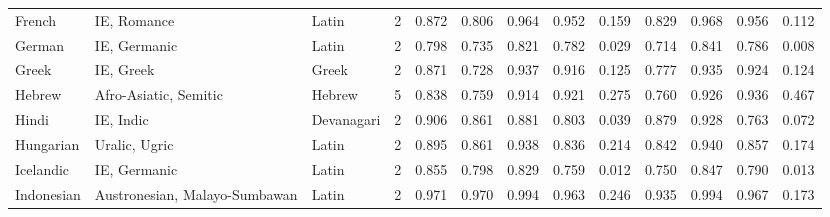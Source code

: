\begin{tabular}{lllrrrrrrrrrr}
                         French &                     IE, Romance &      Latin &         2 &                       0.872 &                         0.806 &         0.964 &                  0.952 &            0.159 &                         0.829 &         0.968 &                  0.956 &            0.112 \\
                         German &                    IE, Germanic &      Latin &         2 &                       0.798 &                         0.735 &         0.821 &                  0.782 &            0.029 &                         0.714 &         0.841 &                  0.786 &            0.008 \\
                          Greek &                       IE, Greek &      Greek &         2 &                       0.871 &                         0.728 &         0.937 &                  0.916 &            0.125 &                         0.777 &         0.935 &                  0.924 &            0.124 \\
                         Hebrew &           Afro-Asiatic, Semitic &     Hebrew &         5 &                       0.838 &                         0.759 &         0.914 &                  0.921 &            0.275 &                         0.760 &         0.926 &                  0.936 &            0.467 \\
                          Hindi &                       IE, Indic & Devanagari &         2 &                       0.906 &                         0.861 &         0.881 &                  0.803 &            0.039 &                         0.879 &         0.928 &                  0.763 &            0.072 \\
                      Hungarian &                   Uralic, Ugric &      Latin &         2 &                       0.895 &                         0.861 &         0.938 &                  0.836 &            0.214 &                         0.842 &         0.940 &                  0.857 &            0.174 \\
                      Icelandic &                    IE, Germanic &      Latin &         2 &                       0.855 &                         0.798 &         0.829 &                  0.759 &            0.012 &                         0.750 &         0.847 &                  0.790 &            0.013 \\
                     Indonesian &   Austronesian, Malayo-Sumbawan &      Latin &         2 &                       0.971 &                         0.970 &         0.994 &                  0.963 &            0.246 &                         0.935 &         0.994 &                  0.967 &            0.173 \\

\end{tabular}

